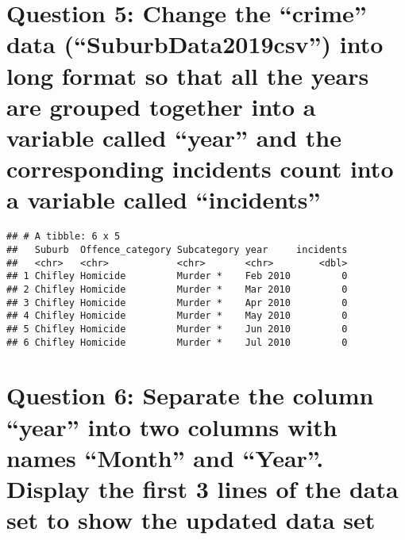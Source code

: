 \documentclass[
]{article}
\newenvironment{Shaded}{\begin{snugshade}}{\end{snugshade}}
\newcommand{\CommentTok}[1]{\textcolor[rgb]{0.56,0.35,0.01}{\textit{#1}}}
\newcommand{\DataTypeTok}[1]{\textcolor[rgb]{0.13,0.29,0.53}{#1}}
\newcommand{\KeywordTok}[1]{\textcolor[rgb]{0.13,0.29,0.53}{\textbf{#1}}}
\newcommand{\NormalTok}[1]{#1}
\newcommand{\OperatorTok}[1]{\textcolor[rgb]{0.81,0.36,0.00}{\textbf{#1}}}
\newcommand{\StringTok}[1]{\textcolor[rgb]{0.31,0.60,0.02}{#1}}
\begin{document}
\hypertarget{question-5-change-the-crime-data-suburbdata2019csv-into-long-format-so-that-all-the-years-are-grouped-together-into-a-variable-called-year-and-the-corresponding-incidents-count-into-a-variable-called-incidents}{%
\section{Question 5: Change the ``crime'' data (``SuburbData2019csv'')
into long format so that all the years are grouped together into a
variable called ``year'' and the corresponding incidents count into a
variable called
``incidents''}\label{question-5-change-the-crime-data-suburbdata2019csv-into-long-format-so-that-all-the-years-are-grouped-together-into-a-variable-called-year-and-the-corresponding-incidents-count-into-a-variable-called-incidents}}

\begin{Shaded}
\end{Shaded}

\begin{verbatim}
## # A tibble: 6 x 5
##   Suburb  Offence_category Subcategory year     incidents
##   <chr>   <chr>            <chr>       <chr>        <dbl>
## 1 Chifley Homicide         Murder *    Feb 2010         0
## 2 Chifley Homicide         Murder *    Mar 2010         0
## 3 Chifley Homicide         Murder *    Apr 2010         0
## 4 Chifley Homicide         Murder *    May 2010         0
## 5 Chifley Homicide         Murder *    Jun 2010         0
## 6 Chifley Homicide         Murder *    Jul 2010         0
\end{verbatim}

\hypertarget{question-6-separate-the-column-year-into-two-columns-with-names-month-and-year.-display-the-first-3-lines-of-the-data-set-to-show-the-updated-data-set}{%
\section{Question 6: Separate the column ``year'' into two columns with
names ``Month'' and ``Year''. Display the first 3 lines of the data set
to show the updated data
set}\label{question-6-separate-the-column-year-into-two-columns-with-names-month-and-year.-display-the-first-3-lines-of-the-data-set-to-show-the-updated-data-set}}
\end{document}
